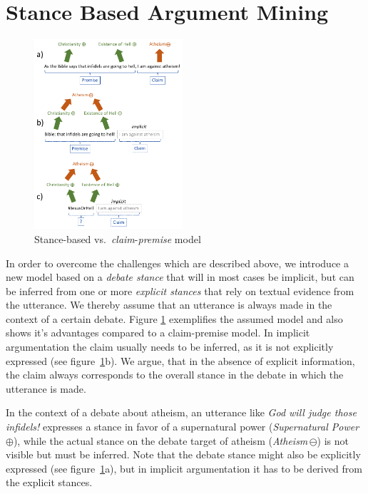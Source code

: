 \documentclass[11pt]{article}
\begin{document}
\section{Stance Based Argument Mining}
\label{fig:SBAM}

\begin{figure}
  \includegraphics[width=0.49\textwidth]{figures/comparison_models_2.png}
  \caption{Stance-based vs.\ \textit{claim}-\textit{premise} model}
  \label{fig:comparison_models}
\end{figure}

In order to overcome the challenges which are described above, we introduce a new model based on a \textit{debate stance} that will in most cases be implicit, but can be inferred from one or more \textit{explicit stances} that rely on textual evidence from the utterance.
We thereby assume that an utterance is always made in the context of a certain debate.
Figure \ref{fig:comparison_models} exemplifies the assumed model and also shows it's advantages compared to a claim-premise model.
In implicit argumentation the claim usually needs to be inferred, as it is not explicitly expressed (see figure~\ref{fig:comparison_models}b).
We argue, that in the absence of explicit information, the claim always corresponds to the overall stance in the debate in which the utterance is made.

In the context of a debate about atheism, an utterance like \textit{God will judge those infidels!} expresses a stance in favor of a supernatural power (\textit{Supernatural Power}\,$\oplus$), while the actual stance on the debate target of atheism (\textit{Atheism}\,$\ominus$) is not visible but must be inferred.
Note that the debate stance might also be explicitly expressed (see figure~\ref{fig:comparison_models}a), but in implicit argumentation it has to be derived from the explicit stances.
\end{document}
